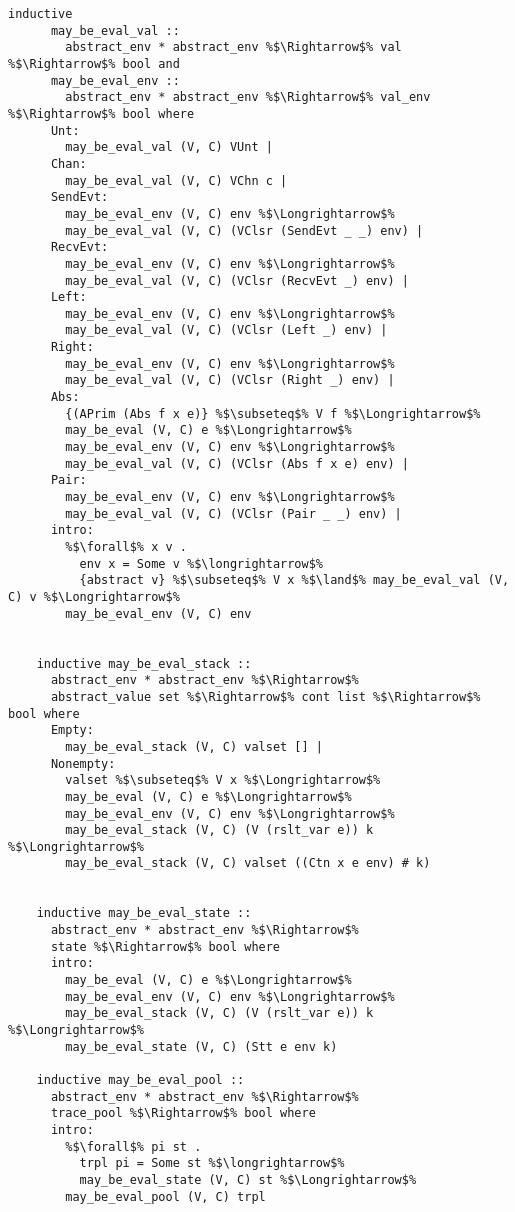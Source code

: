 \documentclass{article}
\begin{document}
\begin{lstlisting}[style=codestyle1, escapechar=\%]
    inductive 
      may_be_eval_val ::
        abstract_env * abstract_env %$\Rightarrow$% val %$\Rightarrow$% bool and  
      may_be_eval_env ::
        abstract_env * abstract_env %$\Rightarrow$% val_env %$\Rightarrow$% bool where
      Unt:
        may_be_eval_val (V, C) VUnt |
      Chan:
        may_be_eval_val (V, C) VChn c |
      SendEvt:
        may_be_eval_env (V, C) env %$\Longrightarrow$%
        may_be_eval_val (V, C) (VClsr (SendEvt _ _) env) |
      RecvEvt:
        may_be_eval_env (V, C) env %$\Longrightarrow$%
        may_be_eval_val (V, C) (VClsr (RecvEvt _) env) |
      Left:
        may_be_eval_env (V, C) env %$\Longrightarrow$%
        may_be_eval_val (V, C) (VClsr (Left _) env) |
      Right:
        may_be_eval_env (V, C) env %$\Longrightarrow$%
        may_be_eval_val (V, C) (VClsr (Right _) env) |
      Abs:
        {(APrim (Abs f x e)} %$\subseteq$% V f %$\Longrightarrow$% 
        may_be_eval (V, C) e %$\Longrightarrow$% 
        may_be_eval_env (V, C) env %$\Longrightarrow$%
        may_be_eval_val (V, C) (VClsr (Abs f x e) env) |
      Pair:
        may_be_eval_env (V, C) env %$\Longrightarrow$%
        may_be_eval_val (V, C) (VClsr (Pair _ _) env) |
      intro:  
        %$\forall$% x v .
          env x = Some v %$\longrightarrow$%
          {abstract v} %$\subseteq$% V x %$\land$% may_be_eval_val (V, C) v %$\Longrightarrow$%
        may_be_eval_env (V, C) env


    inductive may_be_eval_stack ::
      abstract_env * abstract_env %$\Rightarrow$%
      abstract_value set %$\Rightarrow$% cont list %$\Rightarrow$% bool where
      Empty:
        may_be_eval_stack (V, C) valset [] |
      Nonempty: 
        valset %$\subseteq$% V x %$\Longrightarrow$%
        may_be_eval (V, C) e %$\Longrightarrow$%
        may_be_eval_env (V, C) env %$\Longrightarrow$%
        may_be_eval_stack (V, C) (V (rslt_var e)) k %$\Longrightarrow$%
        may_be_eval_stack (V, C) valset ((Ctn x e env) # k)


    inductive may_be_eval_state ::
      abstract_env * abstract_env %$\Rightarrow$%
      state %$\Rightarrow$% bool where
      intro:
        may_be_eval (V, C) e %$\Longrightarrow$%
        may_be_eval_env (V, C) env %$\Longrightarrow$%
        may_be_eval_stack (V, C) (V (rslt_var e)) k %$\Longrightarrow$%
        may_be_eval_state (V, C) (Stt e env k)

    inductive may_be_eval_pool ::
      abstract_env * abstract_env %$\Rightarrow$%
      trace_pool %$\Rightarrow$% bool where
      intro:
        %$\forall$% pi st .
          trpl pi = Some st %$\longrightarrow$%
          may_be_eval_state (V, C) st %$\Longrightarrow$% 
        may_be_eval_pool (V, C) trpl
    
    \end{lstlisting}
\end{document}
